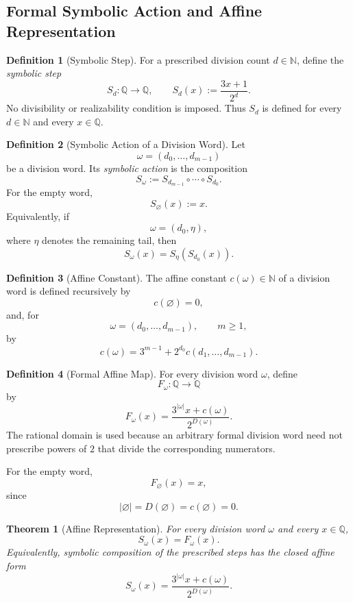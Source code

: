 \documentclass[12pt, oneside]{article}
\numberwithin{equation}{section}
\theoremstyle{definition}
\newtheorem{definition}{Definition}[section]
\theoremstyle{plain}
\newtheorem{theorem}{Theorem}[section]
\theoremstyle{remark}
\begin{document}
\subsection{Formal Symbolic Action and Affine Representation}

\begin{definition}[Symbolic Step]
For a prescribed division count \(d\in\mathbb N\), define the
\emph{symbolic step}
\[
S_d:\mathbb Q\to\mathbb Q,
\qquad
S_d(x):=\frac{3x+1}{2^d}.
\]
No divisibility or realizability condition is imposed. Thus \(S_d\) is
defined for every \(d\in\mathbb N\) and every \(x\in\mathbb Q\).
\end{definition}

\begin{definition}[Symbolic Action of a Division Word]
Let
\[
\omega=(d_0,\dots,d_{m-1})
\]
be a division word. Its \emph{symbolic action} is the composition
\[
S_\omega
:=
S_{d_{m-1}}\circ\cdots\circ S_{d_0}.
\]
For the empty word,
\[
S_{\varnothing}(x):=x.
\]
Equivalently, if
\[
\omega=(d_0,\eta),
\]
where \(\eta\) denotes the remaining tail, then
\[
S_\omega(x)=S_\eta(S_{d_0}(x)).
\]
\end{definition}

\begin{definition}[Affine Constant]
The affine constant \(c(\omega)\in\mathbb N\) of a division word is
defined recursively by
\[
c(\varnothing)=0,
\]
and, for
\[
\omega=(d_0,\dots,d_{m-1}),\qquad m\ge1,
\]
by
\[
c(\omega)
=
3^{m-1}
+
2^{d_0}c(d_1,\dots,d_{m-1}).
\]
\end{definition}

\begin{definition}[Formal Affine Map]
For every division word \(\omega\), define
\[
F_\omega:\mathbb Q\to\mathbb Q
\]
by
\[
F_\omega(x)
=
\frac{3^{|\omega|}x+c(\omega)}
     {2^{D(\omega)}}.
\]
The rational domain is used because an arbitrary formal division word need
not prescribe powers of \(2\) that divide the corresponding numerators.

For the empty word,
\[
F_{\varnothing}(x)=x,
\]
since
\[
|\varnothing|=D(\varnothing)=c(\varnothing)=0.
\]
\end{definition}

\begin{theorem}[Affine Representation]
For every division word \(\omega\) and every \(x\in\mathbb Q\),
\[
S_\omega(x)=F_\omega(x).
\]
Equivalently, symbolic composition of the prescribed steps has the
closed affine form
\[
S_\omega(x)
=
\frac{3^{|\omega|}x+c(\omega)}
     {2^{D(\omega)}}.
\]
\end{theorem}
\end{document}
